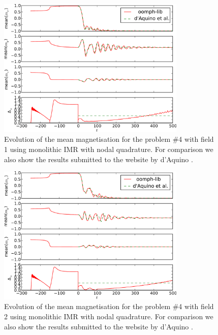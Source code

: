 \begin{figure}
  \centering
  \includegraphics[width=0.8\textwidth]{plots/mumag4_convergence/mumag4_field1-meanmxsvs-meanmysvs-meanmzsvs-dtsvstimes.pdf}
  \caption{
    Evolution of the mean magnetisation for the \mumag problem \#4 with field 1 using monolithic IMR with nodal quadrature.
    For comparison we also show the results submitted to the \mumag website by d'Aquino \etal \cite{mumag-website}.
  }
  \label{fig:nmag-comparison-mumag4-field1}
\end{figure}

\begin{figure}
  \centering
  \includegraphics[width=0.8\textwidth]{plots/mumag4_convergence/mumag4_field2-meanmxsvs-meanmysvs-meanmzsvs-dtsvstimes.pdf}
  \caption{
    Evolution of the mean magnetisation for the \mumag problem \#4 with field 2 using monolithic IMR with nodal quadrature.
    For comparison we also show the results submitted to the \mumag website by d'Aquino \etal \cite{mumag-website}.
  }
  \label{fig:nmag-comparison-mumag4-field2}
\end{figure}

